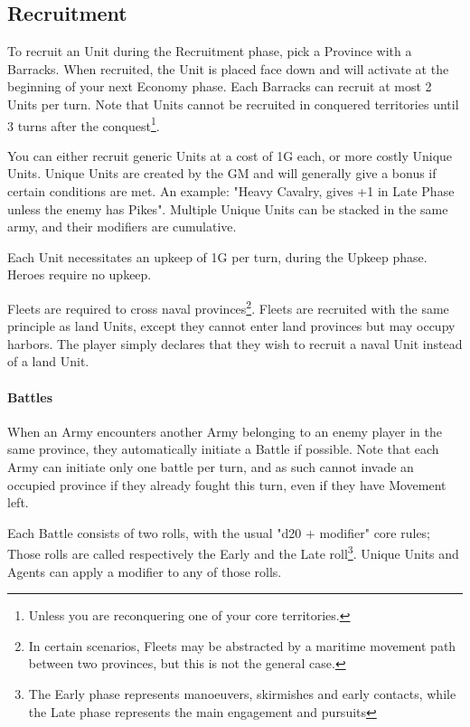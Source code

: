 \subsection{Recruitment}

To recruit an Unit during the Recruitment phase, pick a Province with a Barracks. When recruited, the Unit is placed face down and will activate at the beginning of your next Economy phase. Each Barracks can recruit at most 2 Units per turn. Note that Units cannot be recruited in conquered territories until 3 turns after the conquest\footnote{Unless you are reconquering one of your core territories.}.

You can either recruit generic Units at a cost of 1G each, or more costly Unique Units. Unique Units are created by the GM and will generally give a bonus if certain conditions are met. An example: "Heavy Cavalry, gives +1 in Late Phase unless the enemy has Pikes". Multiple Unique Units can be stacked in the same army, and their modifiers are cumulative.

Each Unit necessitates an upkeep of 1G per turn, during the Upkeep phase. Heroes require no upkeep. 

Fleets are required to cross naval provinces\footnote{In certain scenarios, Fleets may be abstracted by a maritime movement path between two provinces, but this is not the general case.}. Fleets are recruited with the same principle as land Units, except they cannot enter land provinces but may occupy harbors. The player simply declares that they wish to recruit a naval Unit instead of a land Unit. 


\paragraph{Battles}

When an Army encounters another Army belonging to an enemy player in the same province, they automatically initiate a Battle if possible. Note that each Army can initiate only one battle per turn, and as such cannot invade an occupied province if they already fought this turn, even if they have Movement left.

Each Battle consists of two rolls, with the usual "d20 + modifier" core rules; Those rolls are called respectively the Early and the Late roll\footnote{The Early phase represents manoeuvers, skirmishes and early contacts, while the Late phase represents the main engagement and pursuits}. Unique Units and Agents can apply a modifier to any of those rolls.

